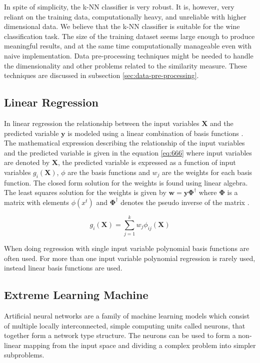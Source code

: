 In spite of simplicity, the k-NN classifier is very robust. It is, however, very reliant on the
training data, computationally heavy, and unreliable with higher dimensional data. We believe that the k-NN classifier is suitable for the wine classification task. The size of the training dataset seems large enough to produce meaningful results, and at the same time computationally manageable even with naive implementation. Data pre-processing techniques might be needed to handle the dimensionality and other problems related to the similarity measure. These techniques are discussed in subsection \ref{sec:data-pre-processing}.

\subsection{Linear Regression}
In linear regression the relationship between the input variables $\mathbf{X}$ and the predicted variable $\mathbf{y}$ is modeled using a linear combination of basis functions \cite{alpaydin:2004:introduction}. The mathematical expression describing the relationship of the input variables and the predicted variable is given in the equation \ref{eq:666} where input variables are denoted by $\mathbf{X}$, the predicted variable is expressed as a function of input variables $g_{i}(\mathbf{X})$, $\phi$ are the basis functions and $w_{j}$ are the weights for each basis function. The closed form solution for the weights is found using linear algebra. The least squares solution for the weights is given by $\mathbold{w = y\Phi^{\dagger}}$ where $\mathbold{\Phi}$ is a matrix with elements $\phi(x^{t})$ and $\mathbold{\Phi^{\dagger}}$ denotes the pseudo inverse of the matrix \cite{alpaydin:2004:introduction}.

\begin{equation}
    \label{eq:666}
    g_{i}(\mathbf{X}) = \sum^{k}_{j=1}{w_{j}\phi_{ij}(\mathbf{X})}
\end{equation}

When doing regression with single input variable polynomial basis functions are often used. For more than one input variable polynomial regression is rarely used, instead linear basis functions are used. \cite{alpaydin:2004:introduction}

\subsection{Extreme Learning Machine}
Artificial neural networks are a family of machine learning models which consist of multiple locally interconnected, simple computing units called neurons, that together form a network type structure. The neurons can be used to form a non-linear mapping from the input space and dividing a complex problem into simpler subproblems.~\cite{haykin:2009:neural-networks}

